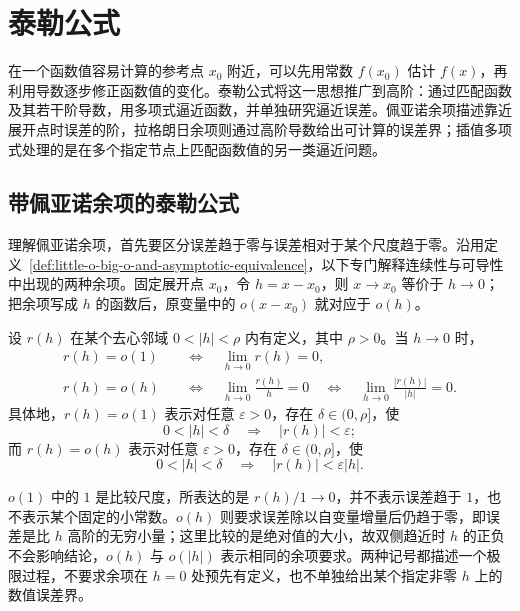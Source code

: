 \section{泰勒公式}
\label{sec:taylor-formula}

在一个函数值容易计算的参考点 $x_0$ 附近，可以先用常数 $f(x_0)$ 估计 $f(x)$，再利用导数逐步修正函数值的变化。泰勒公式将这一思想推广到高阶：通过匹配函数及其若干阶导数，用多项式逼近函数，并单独研究逼近误差。佩亚诺余项描述靠近展开点时误差的阶，拉格朗日余项则通过高阶导数给出可计算的误差界；插值多项式处理的是在多个指定节点上匹配函数值的另一类逼近问题。

\subsection{带佩亚诺余项的泰勒公式}
\label{subsec:taylor-formula-with-peano-remainder}

理解佩亚诺余项，首先要区分误差趋于零与误差相对于某个尺度趋于零。沿用定义~\ref{def:little-o-big-o-and-asymptotic-equivalence}，以下专门解释连续性与可导性中出现的两种余项。固定展开点 $x_0$，令 $h=x-x_0$，则 $x\to x_0$ 等价于 $h\to0$；把余项写成 $h$ 的函数后，原变量中的 $o(x-x_0)$ 就对应于 $o(h)$。

\begin{definition}
\label{def:peano-little-o-scales}
设 $r(h)$ 在某个去心邻域 $0<|h|<\rho$ 内有定义，其中 $\rho>0$。当 $h\to0$ 时，
\begin{equation}
    \begin{aligned}
        r(h)=o(1)
        &\quad\Longleftrightarrow\quad \lim_{h\to0}r(h)=0,\\
        r(h)=o(h)
        &\quad\Longleftrightarrow\quad \lim_{h\to0}\frac{r(h)}h=0
        \quad\Longleftrightarrow\quad
        \lim_{h\to0}\frac{|r(h)|}{|h|}=0.
    \end{aligned}
    \label{eq:peano-little-o-scales}
\end{equation}
具体地，$r(h)=o(1)$ 表示对任意 $\varepsilon>0$，存在 $\delta\in(0,\rho]$，使
\[
    0<|h|<\delta\quad\Longrightarrow\quad |r(h)|<\varepsilon;
\]
而 $r(h)=o(h)$ 表示对任意 $\varepsilon>0$，存在 $\delta\in(0,\rho]$，使
\[
    0<|h|<\delta\quad\Longrightarrow\quad |r(h)|<\varepsilon|h|.
\]
\end{definition}

$o(1)$ 中的 $1$ 是比较尺度，所表达的是 $r(h)/1\to0$，并不表示误差趋于 $1$，也不表示某个固定的小常数。$o(h)$ 则要求误差除以自变量增量后仍趋于零，即误差是比 $h$ 高阶的无穷小量；这里比较的是绝对值的大小，故双侧趋近时 $h$ 的正负不会影响结论，$o(h)$ 与 $o(|h|)$ 表示相同的余项要求。两种记号都描述一个极限过程，不要求余项在 $h=0$ 处预先有定义，也不单独给出某个指定非零 $h$ 上的数值误差界。

